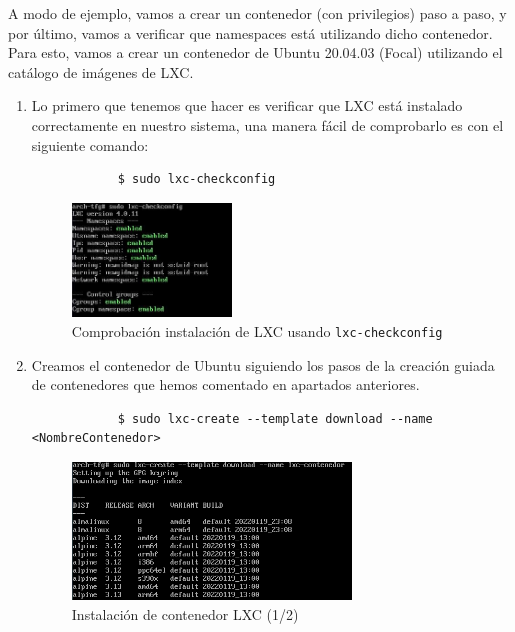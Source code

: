 \documentclass[a4paper, oneside, 12pt]{book}
\begin{document}
	\noindent A modo de ejemplo, vamos a crear un contenedor (con privilegios) paso a paso, y por último, vamos a verificar que namespaces está utilizando dicho contenedor. Para esto, vamos a crear un contenedor de Ubuntu 20.04.03 (Focal) utilizando el catálogo de imágenes de LXC.
	
	\begin{enumerate}
		\item Lo primero que tenemos que hacer es verificar que LXC está instalado correctamente en nuestro sistema, una manera fácil de comprobarlo es con el siguiente comando:
		\begin{verbatim}
			$ sudo lxc-checkconfig
		\end{verbatim}
	
		\begin{figure}[h!]
			\begin{center}
				\includegraphics[width=0.4\textwidth]{img/lxc_ns1.jpg}
				\caption{Comprobación instalación de LXC usando \texttt{lxc-checkconfig}}
			\end{center}
		\end{figure}
	
		\item Creamos el contenedor de Ubuntu siguiendo los pasos de la creación guiada de contenedores que hemos comentado en apartados anteriores.
		\begin{verbatim}
			$ sudo lxc-create --template download --name <NombreContenedor>
		\end{verbatim}
		
		\begin{figure}[h!]
			\begin{center}
				\includegraphics[width=0.7\textwidth]{img/lxc_ns2.png}
				\caption{Instalación de contenedor LXC (1/2)}
			\end{center}
		\end{figure}
		

\end{enumerate}
\end{document}

